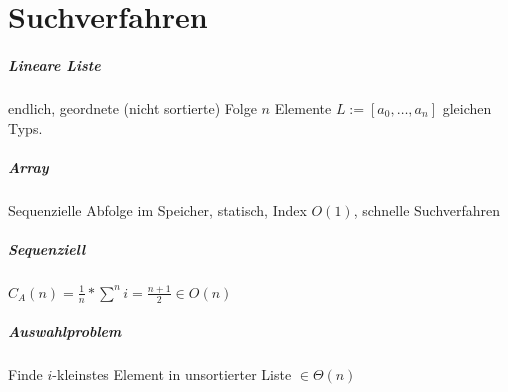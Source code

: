 
\chapter{Suchverfahren}

\paragraph{Lineare Liste}
endlich, geordnete (nicht sortierte) Folge $n$ Elemente $L := [a_0, \dots, a_n]$ gleichen Typs.

\paragraph{Array}
Sequenzielle Abfolge im Speicher, statisch, Index $O(1)$, schnelle Suchverfahren 

\paragraph{Sequenziell}
$C_A(n) = \frac{1}{n} * \sum^n i = \frac{n + 1}{2} \in O(n)$\

\begin{algorithm}[H]



\end{algorithm}


\paragraph{Auswahlproblem}
Finde $i$-kleinstes Element in unsortierter Liste $\in \Theta (n)$


